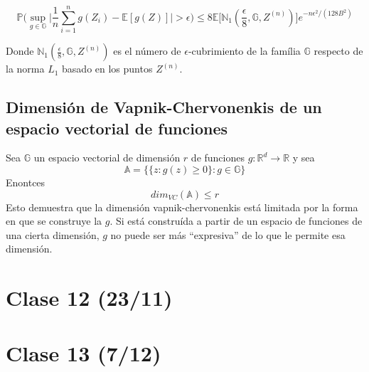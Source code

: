 \documentclass[12pt, a4paper]{article}
\begin{document}
$$
\mathds{P}\Bigg( \mathop{sup}_{g\in\mathds{G}} \big| \frac{1}{n} \sum_{i=1}^n g(Z_i) - \mathds{E}[g(Z)] \big| >\epsilon \Bigg)
\leq
8\mathds{E}\Bigg[ \mathds{N}_1(\frac{\epsilon}{8},\mathds{G},Z^{(n)}) \Bigg] e^{-n\epsilon^2/(128B^2)}
$$

Donde $ \mathds{N}_1(\frac{\epsilon}{8},\mathds{G},Z^{(n)}) $ es el número de $\epsilon$-cubrimiento de la família $\mathds{G}$ respecto de la norma $L_1$ basado en los puntos $Z^{(n)}$.
\subsection{Dimensión de Vapnik-Chervonenkis de un espacio vectorial de funciones}
Sea $\mathds{G}$ un espacio vectorial de dimensión $r$  de funciones $g:\mathds{R}^d\rightarrow\mathds{R}$ y sea $$\mathds{A}=\Big\{ \{ z:g(z)\geq 0 \} : g\in\mathds{G}\Big\}$$
Enontces $$dim_{VC}(\mathds{A})\leq r$$
Esto demuestra que la dimensión vapnik-chervonenkis está limitada por la forma en que se construye la $g$. Si está construída a partir de un espacio de funciones de una cierta dimensión, $g$ no puede ser más ``expresiva'' de lo que le permite esa dimensión.

\section{Clase 12 (23/11)}
\section{Clase 13 (7/12)}
\end{document}
